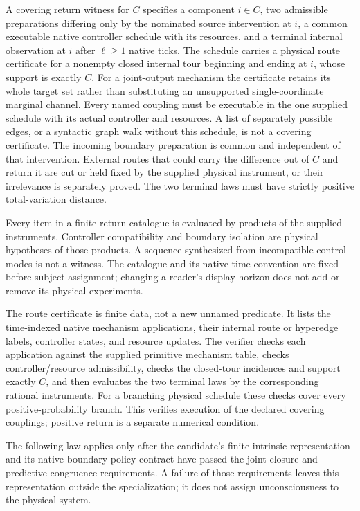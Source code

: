 \begin{definition}
A covering return witness for $C$ specifies a component $i\in C$, two admissible
preparations differing only by the nominated source intervention at $i$,
a common executable native controller schedule with its resources,
and a terminal internal observation at $i$ after $\ell\ge1$ native ticks.
The schedule carries a physical route certificate for a nonempty closed
internal tour beginning and ending at $i$, whose support is exactly $C$.
For a joint-output mechanism the certificate retains its whole target
set rather than substituting an unsupported single-coordinate marginal
channel. Every named coupling must be executable in the one supplied
schedule with its actual controller and resources. A list of separately
possible edges, or a syntactic graph walk without this schedule, is not
a covering certificate.
The incoming boundary preparation is common and independent of that
intervention. External routes that could carry the difference out of
$C$ and return it are cut or held fixed by the supplied physical
instrument, or their irrelevance is separately proved. The two terminal
laws must have strictly positive total-variation distance.
\end{definition}

Every item in a finite return catalogue is evaluated by products of the
supplied instruments. Controller compatibility and boundary isolation
are physical hypotheses of those products. A sequence synthesized from
incompatible control modes is not a witness. The catalogue and its native
time convention are fixed before subject assignment; changing a reader's
display horizon does not add or remove its physical experiments.

The route certificate is finite data, not a new unnamed predicate. It
lists the time-indexed native mechanism applications, their internal
route or hyperedge labels, controller states, and resource updates.
The verifier checks each application against the supplied primitive
mechanism table, checks controller/resource admissibility, checks the
closed-tour incidences and support exactly $C$, and then evaluates the
two terminal laws by the corresponding rational instruments. For a
branching physical schedule these checks cover every positive-probability
branch. This verifies execution of the declared covering couplings;
positive return is a separate numerical condition.

The following law applies only after the candidate's finite intrinsic
representation and its native boundary-policy contract have passed the
joint-closure and predictive-congruence requirements. A failure of those
requirements leaves this representation outside the specialization; it
does not assign unconsciousness to the physical system.

